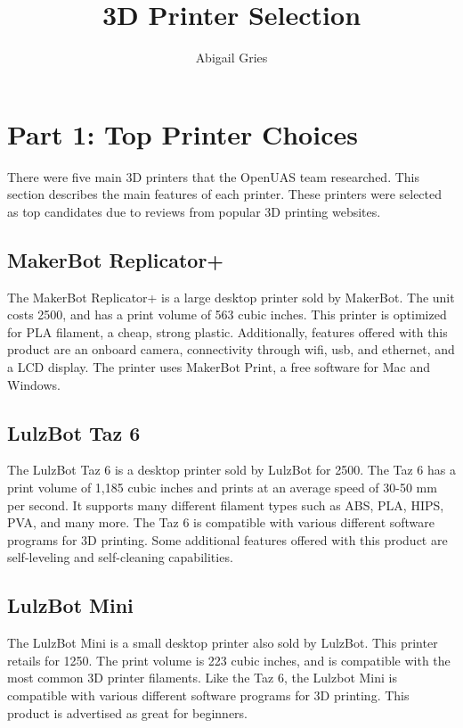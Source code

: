 \documentclass{article}
\begin{document}
\title{\textbf{3D Printer Selection}}
\author{Abigail Gries}
\maketitle

\section*{Part 1: Top Printer Choices}
There were five main 3D printers that the OpenUAS team researched. This section describes the main features of each printer. These printers were selected as top candidates due to reviews from popular 3D printing websites.

\subsection*{MakerBot Replicator+}
The MakerBot Replicator+ is a large desktop printer sold by MakerBot. The unit costs 2500, and has a print volume of 563 cubic inches. This printer is optimized for PLA filament, a cheap, strong plastic. Additionally, features offered with this product are an onboard camera, connectivity through wifi, usb, and ethernet, and a LCD display. The printer uses MakerBot Print, a free software for Mac and Windows.

\subsection*{LulzBot Taz 6}
The LulzBot Taz 6 is a desktop printer sold by LulzBot for 2500. The Taz 6 has a print volume of 1,185 cubic inches and prints at an average speed of 30-50 mm per second. It supports many different filament types such as ABS, PLA, HIPS, PVA, and many more. The Taz 6 is compatible with various different software programs for 3D printing. Some additional features offered with this product are self-leveling and self-cleaning capabilities.

\subsection*{LulzBot Mini}
The LulzBot Mini is a small desktop printer also sold by LulzBot. This printer retails for 1250. The print volume is 223 cubic inches, and is compatible with the most common 3D printer filaments. Like the Taz 6, the Lulzbot Mini is compatible with various different software programs for 3D printing. This product is advertised as great for beginners.
\end{document}
